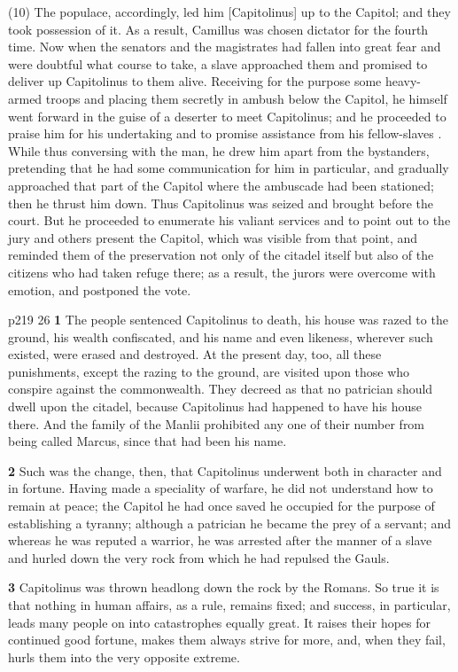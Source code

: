 (10) The populace, accordingly, led him [Capitolinus] up to the Capitol; and they took possession of it. As a result, Camillus was chosen dictator for the fourth time. Now when the senators and the magistrates had fallen into great fear and were doubtful what course to take, a slave approached them and promised to deliver up Capitolinus to them alive. Receiving for the purpose some heavy-armed troops and pla­cing them secretly in ambush below the Capitol, he himself went forward in the guise of a deserter to meet Capitolinus; and he proceeded to praise him for his undertaking and to promise assistance from his fellow-slaves . While thus conversing with the man, he drew him apart from the bystanders, pretending that he had some communication for him in particular, and gradually approached that part of the Capitol where the ambuscade had been stationed; then he thrust him down. Thus Capitolinus was seized and brought before the court. But he proceeded to enumerate his valiant services and to point out to the jury and others present the Capitol, which was visible from that point, and reminded them of the preservation not only of the citadel itself but also of the citizens who had taken refuge there; as a result, the jurors were overcome with emotion, and postponed the vote.

p219
26
\textbf{1} The people sentenced Capitolinus to death, his house was razed to the ground, his wealth confiscated, and his name and even likeness, wherever such existed, were erased and destroyed. At the present day, too, all these punishments, except the razing to the ground, are visited upon those who conspire against the commonwealth. They decreed as that no patrician should dwell upon the citadel, because Capitolinus had happened to have his house there. And the family of the Manlii prohibited any one of their number from being called Marcus, since that had been his name.

\textbf{2}
Such was the change, then, that Capitolinus underwent both in character and in fortune. Having made a speciality of warfare, he did not understand how to remain at peace; the Capitol he had once saved he occupied for the purpose of establishing a tyranny; although a patrician he became the prey of a servant; and whereas he was reputed a warrior, he was arrested after the manner of a slave and hurled down the very rock from which he had repulsed the Gauls.

\textbf{3}
Capitolinus was thrown headlong down the rock by the Romans. So true it is that nothing in human affairs, as a rule, remains fixed; and success, in particular, leads many people on into catastrophes equally great. It raises their hopes for continued good fortune, makes them always strive for more, and, when they fail, hurls them into the very opposite extreme.

